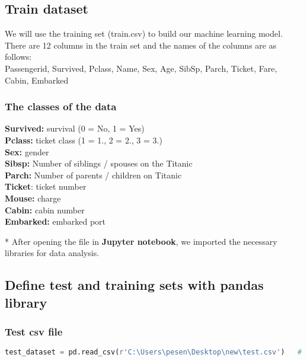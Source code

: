 \documentclass[onecolumn]{article}
\begin{document}
\subsection{Train dataset}

We will use the training set (train.csv) to build our machine learning model. There are 12 columns in the train set and the names of the columns are as follows:\\
Passengerid, Survived, Pclass, Name, Sex, Age, SibSp, Parch, Ticket, Fare, Cabin, Embarked\\

\subsubsection{The classes of the data}
\begin{itemize}

\textbf{Survived:} survival (0 = No, 1 = Yes)\\
\textbf{Pclass:} ticket class (1 = 1., 2 = 2., 3 = 3.)\\
\textbf{Sex:} gender\\
\textbf{Sibsp:} Number of siblings / spouses on the Titanic\\
\textbf{Parch:} Number of parents / children on Titanic\\
\textbf{Ticket}: ticket number\\
\textbf{Mouse:} charge\\
\textbf{Cabin:} cabin number\\
\textbf{Embarked:} embarked port\\
\end{itemize}

* After opening the file in \textbf{Jupyter notebook}, we imported the necessary libraries for data analysis.

\subsection{Define test and training sets with pandas library} 

\subsubsection{Test csv file }

\begin{lstlisting}[language=Python, caption= test] 
test_dataset = pd.read_csv(r'C:\Users\pesen\Desktop\new\test.csv')   # for Fatma (r'C:\Users\Fatma\Desktop\new\test.csv')
\end{lstlisting}
 
\end{document}
